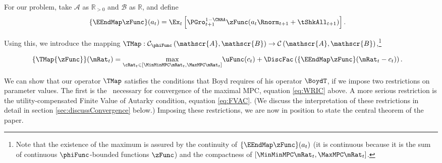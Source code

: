 \documentclass[BufferStockTheory]{subfiles}
\begin{document}
For our problem, take $\mathscr{A}$ as $\mathbb{R}_{>0}$ and $\mathscr{B}$
as $\mathbb{R}$, and define
\begin{align*}
  \{\EEndMap \zFunc\}(a_{t})  & = \Ex_{t}\left[\PGro^{1-\CRRA}_{t+1} \zFunc(a_{t} \Rnorm_{t+1} + \tShkAll_{t+1})\right].
\end{align*}

Using this, we introduce the mapping \textit{$\TMap:\mathcal{C}_{\phiFunc }\left( \mathscr{A},\mathscr{B}\right) \rightarrow \mathcal{C}\left(
    \mathscr{A},\mathscr{B}\right) $},\footnote{Note that the existence of the maximum is assured by the continuity of $\{\EEndMap \zFunc\}(a_{t})$ (it is continuous because it is the sum of continuous $\phiFunc$-bounded functions $\zFunc$) and the compactness of $[\MinMinMPC \mRat_{t},  \MaxMPC \mRat_{t}]$.}
\begin{comment} %
  (In the subtle case when $\MinMinMPC=0$, the compact interval could be revised as $ [(\MinMinMPC+\epsilon) \mRat_{t},
  \MaxMPC \mRat_{t}]$ where $\epsilon$ is a very small positive number because obviously $\MinMinMPC \mRat_{t}=0$ will not be the $\argmax$)
\end{comment}
\begin{align}
  \{\TMap{\zFunc}\}(\mRat_{t})  & = \underset{{\cRat}_{t} \in
                                  [\MinMinMPC \mRat_{t}, \MaxMPC \mRat_{t}]
                                  } \max
                                  \uFunc(c_{t})+\DiscFac \left( \{\EEndMap \zFunc \}(\mRat_{t}-c_{t}) \right)  \label{definitionmappingT}.
\end{align}


\begin{comment}
  Unpacking the definitions, our mapping $\TMap$ can be written more explicitly as
  \begin{align}
    \{\TMap\zFunc\}(\mRat_{t})  & = \underset{\cRat_{t} \in [\MinMinMPC
                                  \mRat_{t}, \MaxMPC \mRat_{t}]} \max \left\{
                                  \uFunc(c_{t})+\DiscFac \Ex_{t}\left[ {\PGro}_{t+1} ^{1-\CRRA }\zFunc(
                                  {\aRat}_{t}\Rnorm_{t+1}+\tShkAll_{t+1}) \right] \right\}
                                  .
  \end{align}
\end{comment}

\hypertarget{Contraction-Conditions}{}

We can show that our operator $\TMap$ satisfies the conditions that
Boyd requires of his operator $\BoydT$, if we impose two restrictions
on parameter values.  The first is the \WRIC~necessary for
convergence of the maximal MPC, equation \eqref{eq:WRIC} above.  A
more serious restriction is the utility-compensated Finite Value of
Autarky condition, equation \eqref{eq:FVAC}.  (We discuss the
interpretation of these restrictions in detail in section
\ref{sec:discussConvergence} below.)  Imposing these restrictions, we
are now in position to state the central theorem of the paper.
\end{document}
